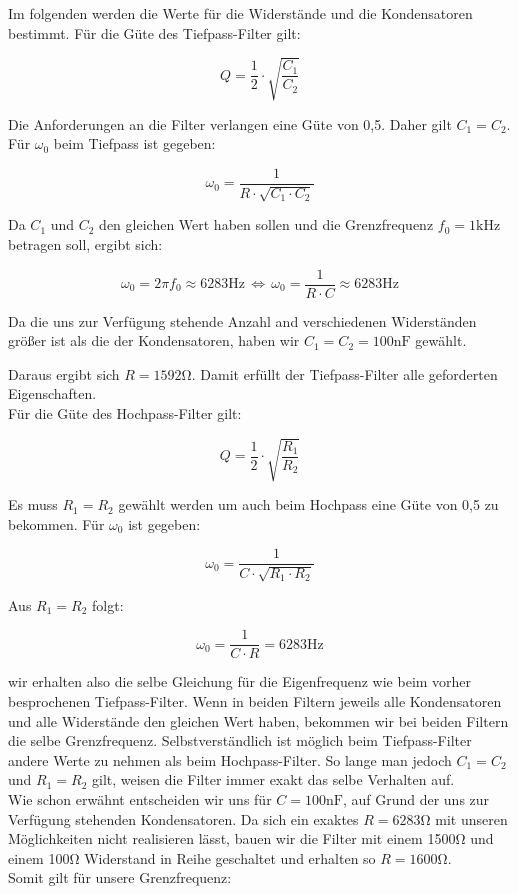 Im folgenden werden die Werte für die Widerstände und die Kondensatoren bestimmt.
Für die Güte des Tiefpass-Filter gilt:

$$ Q = \frac{1}{2}\cdot\sqrt{\frac{C_{1}}{C_{2}}} $$

Die Anforderungen an die Filter verlangen eine Güte von 0,5. Daher gilt $C_{1}=C_{2}$.\\
Für $\omega_{0}$ beim Tiefpass ist gegeben:

$$\omega_{0}=\frac{1}{R\cdot\sqrt{C_{1} \cdot C_{2}}}$$

Da $C_{1}$ und $C_{2}$ den gleichen Wert haben sollen und die Grenzfrequenz $f_{0}=1\si{\kilo\hertz}$ betragen soll, ergibt sich:

$$\omega_{0}=2\pi f_{0} \approx 6283\si{\hertz} \, \Leftrightarrow \,\omega_{0}=\frac{1}{R\cdot C}\approx 6283\si{\hertz} $$

Da die uns zur Verfügung stehende Anzahl and verschiedenen Widerständen größer ist als die der Kondensatoren, haben wir $C_{1}=C_{2}=100\si{\nano\farad}$ gewählt.

Daraus ergibt sich $R=1592\si{\ohm}$. Damit erfüllt der Tiefpass-Filter alle geforderten Eigenschaften. \\
Für die Güte des Hochpass-Filter gilt:

$$Q=\frac{1}{2}\cdot\sqrt{\frac{R_{1}}{R_{2}}}$$

Es muss $R_{1}=R_{2}$ gewählt werden um auch beim Hochpass eine Güte von 0,5 zu bekommen.
Für $\omega_{0}$ ist gegeben:

$$\omega_{0} = \frac{1}{C\cdot\sqrt{R_{1}\cdot R_{2}}}$$

Aus $R_{1}=R_{2}$ folgt:

$$\omega_{0} = \frac{1}{C\cdot R}=6283\si{\hertz}$$

wir erhalten also die selbe Gleichung für die Eigenfrequenz wie beim vorher besprochenen Tiefpass-Filter. Wenn in beiden Filtern jeweils alle Kondensatoren und alle Widerstände den gleichen Wert haben, bekommen wir bei beiden Filtern die selbe Grenzfrequenz. Selbstverständlich ist möglich beim Tiefpass-Filter andere Werte zu nehmen als beim Hochpass-Filter. So lange man jedoch $C_{1}=C_{2}$ und $R_{1}=R_{2}$ gilt, weisen die Filter immer exakt das selbe Verhalten auf.\\
Wie schon erwähnt entscheiden wir uns für $C=100\si{\nano\farad}$, auf Grund der uns zur Verfügung stehenden Kondensatoren. Da sich ein exaktes $R=6283\si{\ohm}$ mit unseren Möglichkeiten nicht realisieren lässt, bauen wir die Filter mit einem 1500\si{\ohm} und einem 100\si{\ohm} Widerstand in Reihe geschaltet und erhalten so $R=1600\si{\ohm}$.\\
Somit gilt für unsere Grenzfrequenz:

